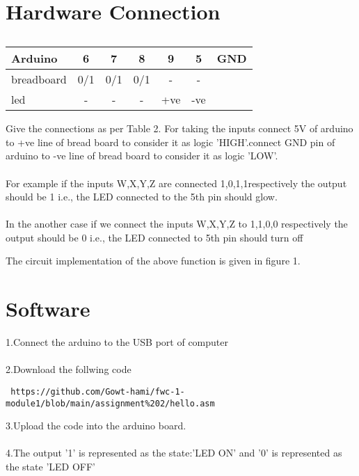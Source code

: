 \documentclass[10pt, a4paper]{article}
\begin{document}
 
     
    \section{Hardware Connection}


    
    \begin{table}[htbp]
 \begin{center}
    \begin{tabular}{|l|c|c|c|c|c|c|} \hline 
  \textbf{Arduino}& \textbf{6} & \textbf{7} & \textbf{8}&\textbf{9}&\textbf{5} &\textbf{GND} \\
   \hline
 breadboard & 0/1 & 0/1 & 0/1  & - & -\\ 
 \hline 
led & - & - & - & +ve & -ve \\ 
 \hline 
\end{tabular}   
\end{center}
\caption{\label{table:dummytable} }
\end{table}
Give the connections as per Table 2. For taking the inputs connect 5V of arduino to +ve line of bread board to consider it as logic 'HIGH'.connect GND pin of arduino to -ve line of bread board to consider it as logic 'LOW'.
\\
\\
For example if the inputs W,X,Y,Z are connected 1,0,1,1respectively the output should be 1 i.e., the LED connected to the 5th pin should glow.
\\
\\
In the another case if we connect the inputs W,X,Y,Z to 1,1,0,0 respectively the output should be 0 i.e., the LED connected to 5th pin should turn off

The circuit implementation of the above function is given in figure 1.




  \section{Software}
  1.Connect the arduino to the USB port of computer
  \\
  \\2.Download the follwing code
  \\
  \begin{lstlisting}
 https://github.com/Gowt-hami/fwc-1-module1/blob/main/assignment%202/hello.asm
  \end{lstlisting}
  
  3.Upload the code into the arduino board.
  \\
  \\4.The output '1' is represented as the state:'LED ON' and '0' is represented as the state 'LED OFF' 
 
\end{document}
